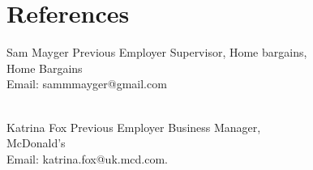 \documentclass[]{friggeri-cv}
\begin{document}
\section{References}
\begin{entrylist}
	\entry
	{}
	{Sam Mayger}
	{Previous Employer}
	{Supervisor, Home bargains, \\ Home Bargains \\  Email: sammmayger@gmail.com}

	\\
	\entry
		{}
	{Katrina Fox}
	{Previous Employer}
	{Business Manager, \\ McDonald's \\ Email: katrina.fox@uk.mcd.com.}
\end{entrylist}
\end{document}
